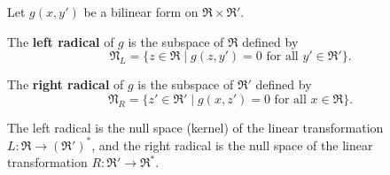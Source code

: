 Let $g(x, y')$ be a bilinear form on $\mathfrak{R} \times \mathfrak{R}'$.

The \textbf{left radical} of $g$ is the subspace of $\mathfrak{R}$ defined by
$$\mathfrak{N}_L = \{ z \in \mathfrak{R} \mid g(z, y') = 0 \text{ for all } y' \in \mathfrak{R}' \}.$$

The \textbf{right radical} of $g$ is the subspace of $\mathfrak{R}'$ defined by
$$\mathfrak{N}_R = \{ z' \in \mathfrak{R}' \mid g(x, z') = 0 \text{ for all } x \in \mathfrak{R} \}.$$

The left radical is the null space (kernel) of the linear transformation $L: \mathfrak{R} \to (\mathfrak{R}')^*$, and the right radical is the null space of the linear transformation $R: \mathfrak{R}' \to \mathfrak{R}^*$.
